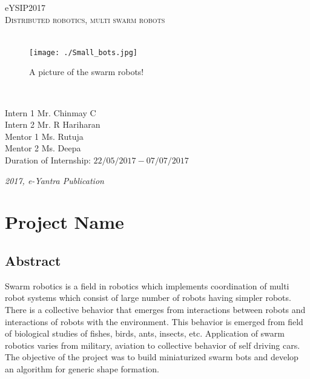 \documentclass[a4paper,12pt,oneside]{book}
\begin{document}
\begin{titlepage}
\raggedright
{\Large eYSIP2017\\[1cm]}
{\Huge\scshape Distributed robotics, multi swarm robots \\[.1in]}
\vfill
\hfill\\
\begin{figure}[h!]
	\caption{A picture of the swarm robots!}
	\texttt{[image: ./Small\_bots.jpg]}		
\end{figure}	
\hfill\\
\begin{flushright}
{\large Intern 1 Mr. Chinmay C \\}
{\large Intern 2 Mr. R Hariharan \\}
{\large Mentor 1 Ms. Rutuja \\}
{\large Mentor 2 Ms. Deepa \\}
{\large Duration of Internship: $ 22/05/2017-07/07/2017 $ \\}
\end{flushright}

{\itshape 2017, e-Yantra Publication}
\end{titlepage}

\chapter[Project Tag]{Project Name}
\section*{Abstract}
Swarm robotics is a field in robotics which implements coordination of multi robot systems which consist of large number of robots having simpler robots. There is a collective behavior that emerges from interactions between robots and interactions of robots with the environment. This behavior is emerged from field of biological studies of fishes, birds, ants, insects, etc. Application of swarm robotics varies from military, aviation to collective behavior of self driving cars. The objective of the project was to build miniaturized swarm bots and develop an algorithm for generic shape formation.
\end{document}
